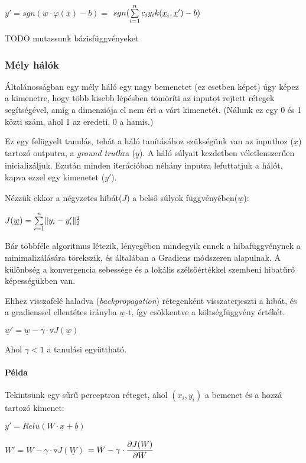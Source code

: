 $ y' = sgn(\underline{w} \cdot \varphi(\underline{x}) - b) = $
$ sgn(\sum\limits_{{i}=1}^{n} c_i y_i k(\underline{x}_i, \underline{x}') - b) $


TODO mutassunk bázisfüggvényeket


\subsubsection{Mély hálók}

Általánosságban egy mély háló egy nagy bemenetet (ez esetben képet) úgy képez
a kimenetre, hogy több kisebb lépésben tömöríti az inputot rejtett rétegek segítségével,
amíg a dimenziója el nem éri a várt kimenetét. 
(Nálunk ez egy 0 és 1 közti szám, ahol 1 az eredeti, 0 a hamis.)


Ez egy felügyelt tanulás, tehát a háló tanításához szükségünk van az inputhoz ($ \underline{x} $) 
tartozó outputra, a \textit{ground truth}ra ($ \underline{y} $). 
A háló súlyait kezdetben véletlenszerűen inicializáljuk.
Ezután minden iterációban néhány inputra lefuttatjuk a hálót, 
kapva ezzel egy kimenetet ($ \underline{y}' $).

\noindent
Nézzük ekkor a négyzetes hibát($ J $) a belső súlyok függvényében($ \underline{w} $):

$ J(\underline{w}) = \sum\limits_{{i}=1}^{n} \lVert y_i-y_i'\rVert_2^2 $

\noindent
Bár többféle algoritmus létezik, lényegében mindegyik ennek a hibafüggvénynek
a minimalizálására törekszik, és általában a Gradiens módszeren alapulnak.
A különbség a konvergencia sebessége és a lokális szélsőértékkel szembeni 
hibatűrő képességükben van.

Ehhez visszafelé haladva (\textit{backpropagation}) rétegenként visszaterjeszti a hibát,
és a gradienssel ellentétes irányba $ \underline{w} $-t, így csökkentve a költségfüggvény értékét.


$ \underline{w}' = \underline{w} - \gamma \cdot \triangledown J(\underline{w})$

\noindent
Ahol $ \gamma < 1 $ a tanulási együttható.


\noindent
\paragraph{Példa}
Tekintsünk egy sűrű perceptron réteget, ahol $ (x_i, y_i) $ a 
bemenet és a hozzá tartozó kimenet:

$ \underline{y}' = Relu(W \cdot \underline{x} + \underline{b}) $

$ W' = W - \gamma \cdot  \triangledown  J(\underline{W})$
$ = W - \gamma \cdot \dfrac{\partial {J(W)}}{\partial {W}} $

